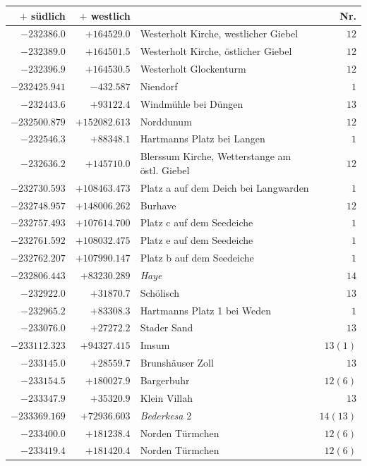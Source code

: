 \clearpage{}%
\begin{center}\begingroup\fontsize{8}{9}\selectfont
\setlength{\tabcolsep}{4pt}
\begin{tabular}{r|r|p{170pt}|r}\hline
\(+\) südlich&\(+\) westlich&&Nr.\\\hline
\(-232386.0\)&\(+164529.0\)&Westerholt Kirche, westlicher Giebel&\(12\)\\
\(-232389.0\)&\(+164501.5\)&Westerholt Kirche, östlicher Giebel&\(12\)\\
\(-232396.9\)&\(+164530.5\)&Westerholt Glockenturm&\(12\)\\
\(-232425.941\)&\(-432.587\)&Niendorf&\(1\)\\
\(-232443.6\)&\(+93122.4\)&Windmühle bei Düngen&\(13\)\\
\(-232500.879\)&\(+152082.613\)&Norddunum&\(12\)\\
\(-232546.3\)&\(+88348.1\)&Hartmanns Platz bei Langen&\(1\)\\
\(-232636.2\)&\(+145710.0\)&Blerssum Kirche, Wetterstange am östl. Giebel&\(12\)\\
\(-232730.593\)&\(+108463.473\)&Platz a auf dem Deich bei Langwarden&\(1\)\\
\(-232748.957\)&\(+148006.262\)&Burhave&\(12\)\\
\(-232757.493\)&\(+107614.700\)&Platz c auf dem Seedeiche&\(1\)\\
\(-232761.592\)&\(+108032.475\)&Platz e auf dem Seedeiche&\(1\)\\
\(-232762.207\)&\(+107990.147\)&Platz b auf dem Seedeiche&\(1\)\\
\(-232806.443\)&\(+83230.289\)&\textit{Haye}&\(14\)\\
\(-232922.0\)&\(+31870.7\)&Schölisch&\(13\)\\
\(-232965.2\)&\(+83308.3\)&Hartmanns Platz 1 bei Weden&\(1\)\\
\(-233076.0\)&\(+27272.2\)&Stader Sand&\(13\)\\
\(-233112.323\)&\(+94327.415\)&Imsum&\(13(1)\)\\
\(-233145.0\)&\(+28559.7\)&Brunshäuser Zoll&\(13\)\\
\(-233154.5\)&\(+180027.9\)&Bargerbuhr&\(12(6)\)\\
\(-233347.9\)&\(+35320.9\)&Klein Villah&\(13\)\\
\(-233369.169\)&\(+72936.603\)&\textit{Bederkesa} 2&\(14(13)\)\\
\(-233400.0\)&\(+181238.4\)&Norden Türmchen&\(12(6)\)\\
\(-233419.4\)&\(+181420.4\)&Norden Türmchen&\(12(6)\)\\

\end{tabular}
\end{center}
